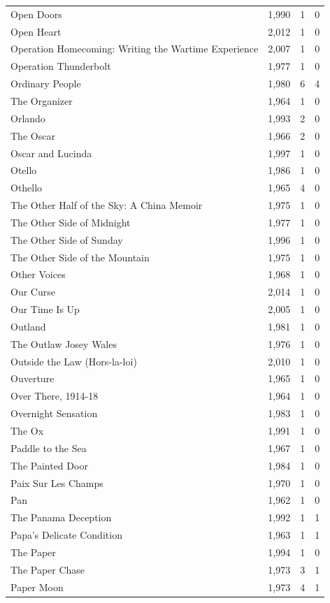 \begin{tabular}{lrrr}
Open Doors & 1,990 & 1 & 0 \\
Open Heart & 2,012 & 1 & 0 \\
Operation Homecoming: Writing the Wartime Experience & 2,007 & 1 & 0 \\
Operation Thunderbolt & 1,977 & 1 & 0 \\
Ordinary People & 1,980 & 6 & 4 \\
The Organizer & 1,964 & 1 & 0 \\
Orlando & 1,993 & 2 & 0 \\
The Oscar & 1,966 & 2 & 0 \\
Oscar and Lucinda & 1,997 & 1 & 0 \\
Otello & 1,986 & 1 & 0 \\
Othello & 1,965 & 4 & 0 \\
The Other Half of the Sky: A China Memoir & 1,975 & 1 & 0 \\
The Other Side of Midnight & 1,977 & 1 & 0 \\
The Other Side of Sunday & 1,996 & 1 & 0 \\
The Other Side of the Mountain & 1,975 & 1 & 0 \\
Other Voices & 1,968 & 1 & 0 \\
Our Curse & 2,014 & 1 & 0 \\
Our Time Is Up & 2,005 & 1 & 0 \\
Outland & 1,981 & 1 & 0 \\
The Outlaw Josey Wales & 1,976 & 1 & 0 \\
Outside the Law (Hors-la-loi) & 2,010 & 1 & 0 \\
Ouverture & 1,965 & 1 & 0 \\
Over There, 1914-18 & 1,964 & 1 & 0 \\
Overnight Sensation & 1,983 & 1 & 0 \\
The Ox & 1,991 & 1 & 0 \\
Paddle to the Sea & 1,967 & 1 & 0 \\
The Painted Door & 1,984 & 1 & 0 \\
Paix Sur Les Champs & 1,970 & 1 & 0 \\
Pan & 1,962 & 1 & 0 \\
The Panama Deception & 1,992 & 1 & 1 \\
Papa's Delicate Condition & 1,963 & 1 & 1 \\
The Paper & 1,994 & 1 & 0 \\
The Paper Chase & 1,973 & 3 & 1 \\
Paper Moon & 1,973 & 4 & 1 \\

\end{tabular}
